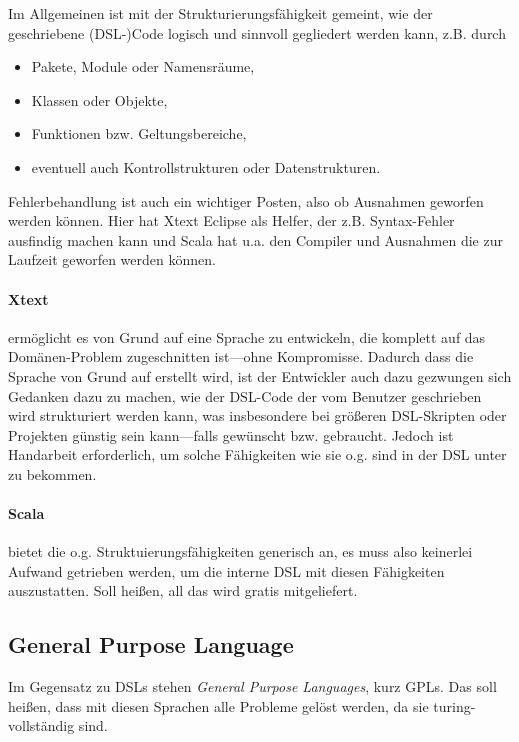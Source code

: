 Im Allgemeinen ist mit der Strukturierungsfähigkeit gemeint, wie der
geschriebene (DSL-)Code logisch und sinnvoll gegliedert werden kann,
z.B. durch

\begin{itemize}
  \item Pakete, Module oder Namensräume,
  \item Klassen oder Objekte,
  \item Funktionen bzw. Geltungsbereiche,
  \item eventuell auch Kontrollstrukturen oder Datenstrukturen.
\end{itemize}

Fehlerbehandlung ist auch ein wichtiger Posten, also ob Ausnahmen
geworfen werden können. Hier hat Xtext Eclipse als Helfer, der
z.B. Syntax-Fehler ausfindig machen kann und Scala hat u.a. den Compiler
und Ausnahmen die zur Laufzeit geworfen werden können.

\paragraph{Xtext} ermöglicht es von Grund auf eine Sprache zu entwickeln,
die komplett auf das Domänen-Problem zugeschnitten ist---ohne Kompromisse.
Dadurch dass die Sprache von Grund auf erstellt wird, ist der Entwickler
auch dazu gezwungen sich Gedanken dazu zu machen, wie der DSL-Code
der vom Benutzer geschrieben wird strukturiert werden kann,
was insbesondere bei größeren DSL-Skripten oder
Projekten günstig sein kann---falls gewünscht bzw. gebraucht.
Jedoch ist Handarbeit erforderlich, um solche Fähigkeiten wie sie o.g.
sind in der DSL unter zu bekommen.

\paragraph{Scala} bietet die o.g. Struktuierungsfähigkeiten generisch an,
es muss also keinerlei Aufwand getrieben werden, um die interne DSL mit
diesen Fähigkeiten auszustatten. Soll heißen, all das wird gratis mitgeliefert.


\subsection{General Purpose Language}\label{sec-gpl}

Im Gegensatz zu DSLs stehen \emph{General Purpose Languages}, kurz GPLs.
Das soll heißen, dass mit diesen Sprachen alle Probleme gelöst werden, da
sie turing-vollständig sind.

